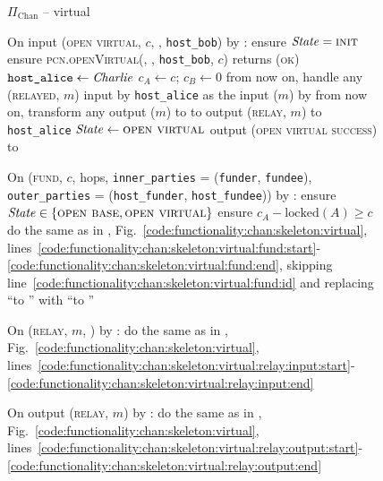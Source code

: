 \begin{figure}[H]
  \begin{protocolbox}{$\Pi_{\mathrm{Chan}}$ -- virtual}
    \begin{algorithmic}[1]
      \State {}
      \State {}
      \State On input (\textsc{open virtual}, $c$, \bob, \texttt{host\_bob}) by
      \charlie:
      \label{code:protocol:chan:skeleton:vchan:open-virtual}
      \Indent
        \State ensure $\mathit{State} = \textsc{init}$
        \State ensure \textsc{pcn.openVirtual}(\bob, \charlie,
        \texttt{host\_bob}, $c$) returns (\textsc{ok})
        \label{code:protocol:chan:skeleton:vchan:ln}
        \State $\texttt{host\_alice} \gets \mathit{Charlie}$
        \State $c_A \gets c$; $c_B \gets 0$
        \State from now on, handle any (\textsc{relayed}, $m$) input by
        \texttt{host\_alice} as the input ($m$) by \environment
        \State from now on, transform any output ($m$) to \environment to
        output (\textsc{relay}, $m$) to \texttt{host\_alice}
        \State $\mathit{State} \gets \textsc{open virtual}$
        \State output (\textsc{open virtual success}) to \charlie
        \label{code:protocol:chan:skeleton:vchan:open-virtual:output}
      \EndIndent
      \Statex

      \State On (\textsc{fund}, $c$, hops, \texttt{inner\_parties} =
      (\texttt{funder}, \texttt{fundee}), \texttt{outer\_parties} =
      (\texttt{host\_funder}, \texttt{host\_fundee})) by \environment:
      \Indent
        \State ensure $\mathit{State} \in \{\textsc{open base}, \textsc{open
        virtual}\}$
        \State ensure $c_A - \mathrm{locked}(A) \geq c$
        \State do the same as in \fchan,
        Fig.~\ref{code:functionality:chan:skeleton:virtual},
        lines~\ref{code:functionality:chan:skeleton:virtual:fund:start}-\ref{code:functionality:chan:skeleton:virtual:fund:end},
        skipping line~\ref{code:functionality:chan:skeleton:virtual:fund:id} and
        replacing ``to \alice'' with ``to \environment''
        \label{code:protocol:chan:skeleton:vchan}
      \EndIndent
      \Statex

      \State On (\textsc{relay}, $m$, \charlie) by \environment:
      \Indent
        \State do the same as in \fchan,
        Fig.~\ref{code:functionality:chan:skeleton:virtual},
        lines~\ref{code:functionality:chan:skeleton:virtual:relay:input:start}-\ref{code:functionality:chan:skeleton:virtual:relay:input:end}
      \EndIndent
      \Statex

      \State On output (\textsc{relay}, $m$) by \charlie:
      \Indent
        \State do the same as in \fchan,
        Fig.~\ref{code:functionality:chan:skeleton:virtual},
        lines~\ref{code:functionality:chan:skeleton:virtual:relay:output:start}-\ref{code:functionality:chan:skeleton:virtual:relay:output:end}
      \EndIndent
    \end{algorithmic}
  \end{protocolbox}
  \caption{}
  \label{code:protocol:chan:skeleton:virtual}
\end{figure}
